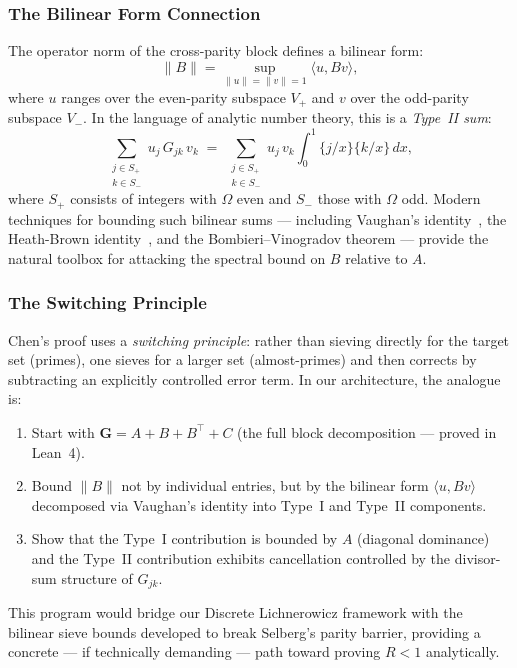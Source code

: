 \documentclass[11pt,a4paper]{article}
\theoremstyle{definition}
\theoremstyle{remark}
\newcommand{\Gram}{\mathbf{G}}
\begin{document}
\subsubsection*{The Bilinear Form Connection}

The operator norm of the cross-parity block defines a bilinear form:
\[
  \|B\| = \sup_{\|u\| = \|v\| = 1} \langle u, Bv \rangle,
\]
where $u$ ranges over the even-parity subspace $V_+$ and $v$ over
the odd-parity subspace $V_-$. In the language of analytic number
theory, this is a \emph{Type~II sum}:
\[
  \sum_{\substack{j \in S_+ \\ k \in S_-}} u_j \, G_{jk} \, v_k
  \;=\;
  \sum_{\substack{j \in S_+ \\ k \in S_-}} u_j \, v_k
  \int_0^1 \{j/x\}\{k/x\}\,dx,
\]
where $S_+$ consists of integers with $\Omega$ even and $S_-$ those
with $\Omega$ odd. Modern techniques for bounding such bilinear sums
--- including Vaughan's identity~\cite{vaughan77}, the Heath-Brown
identity~\cite{heathbrown82}, and the Bombieri--Vinogradov theorem
--- provide the natural toolbox for attacking the spectral bound
on $B$ relative to $A$.

\subsubsection*{The Switching Principle}

Chen's proof uses a \emph{switching principle}: rather than sieving
directly for the target set (primes), one sieves for a larger set
(almost-primes) and then corrects by subtracting an explicitly
controlled error term. In our architecture, the analogue is:
\begin{enumerate}
  \item Start with $\Gram = A + B + B^\top + C$ (the full block
    decomposition --- proved in Lean~4).
  \item Bound $\|B\|$ not by individual entries, but by the
    bilinear form $\langle u, Bv \rangle$ decomposed via Vaughan's
    identity into Type~I and Type~II components.
  \item Show that the Type~I contribution is bounded by $A$
    (diagonal dominance) and the Type~II contribution exhibits
    cancellation controlled by the divisor-sum structure of $G_{jk}$.
\end{enumerate}

This program would bridge our Discrete Lichnerowicz framework with
the bilinear sieve bounds developed to break Selberg's parity barrier,
providing a concrete --- if technically demanding --- path toward
proving $R < 1$ analytically.
\end{document}
